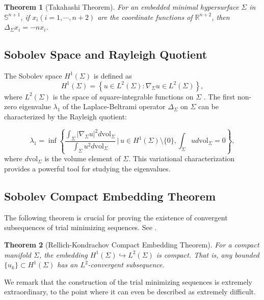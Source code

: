 \documentclass[a4, 12pt]{amsart}
\numberwithin{equation}{section} \numberwithin{equation}{section}
\newtheorem{thm}{Theorem}[section]
\begin{document}
\begin{thm}[Takahashi Theorem]\label{Tak-thm}For an embedded minimal hypersurface $\Sigma$ in $\mathbb{S}^{n+1}$, if $x_{i}(i=1, \cdots, n+2)$ are the coordinate functions of $\mathbb{R}^{n+2}$, then $\Delta_{\Sigma} x_{i}=-n x_{i}$.\end{thm}


\subsection{Sobolev Space and Rayleigh Quotient}

The Sobolev space $H^{1}(\Sigma)$ is defined as
\begin{equation*}H^{1}(\Sigma)=\left\{u \in L^{2}(\Sigma): \nabla_{\Sigma} u \in L^{2}(\Sigma)\right\},\end{equation*} where $L^{2}(\Sigma)$ is the space of square-integrable functions on $\Sigma$ \cite{Eva}. The first non-zero eigenvalue $\lambda_{1}$ of the Laplace-Beltrami operator $\Delta_{\Sigma}$ on $\Sigma$ can be characterized by the Rayleigh quotient:


\begin{equation*}\lambda_1 = \inf \left\{ \frac{\int_{\Sigma} |\nabla_{\Sigma} u|^2 d\mathrm{vol}_{\Sigma}}{\int_{\Sigma} u^2 d\mathrm{vol}_{\Sigma}} \,\bigg|\, u \in H^1(\Sigma) \setminus \{0\}, \int_{\Sigma} u d\mathrm{vol}_{\Sigma} = 0 \right\},\end{equation*}
where $d \mathrm{vol}_{\Sigma}$ is the volume element of $\Sigma$. This variational characterization provides a powerful tool for studying the eigenvalues.






\subsection{Sobolev Compact Embedding Theorem}\label{section:Trun function}
 The following theorem is crucial for proving the existence of convergent subsequences of trial minimizing sequences. See \cite{Au}.
\begin{thm}[Rellich-Kondrachov Compact Embedding Theorem]\label{So-emb-thm} For a compact manifold $\Sigma$, the embedding $H^{1}(\Sigma) \hookrightarrow L^{2}(\Sigma)$ is compact. That is, any bounded $\{u_k\} \subset H^1(\Sigma)$ has an $L^2$-convergent subsequence.\end{thm}
We remark that the construction of the trial minimizing sequences  is extremely extraordinary, to the point where it can even be described as extremely difficult.
\end{document}
